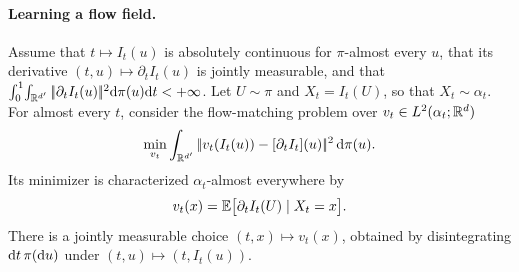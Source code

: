 \paragraph{Learning a flow field.}
\begin{prop}\label{prop-flow-matching-vector-field}
Assume that $t\mapsto I_t(u)$ is absolutely continuous for $\pi$-almost every $u$, that its derivative $(t,u)\mapsto\partial_t I_t(u)$ is jointly measurable, and that \(\int_0^1\!\int_{\mathbb{R}^{d'}}|\!| \partial_t I_t(u) |\!|^2\mathrm{d}\pi(u)\mathrm{d} t<+\infty\).
Let \(U\sim\pi\) and \(X_t=I_t(U)\), so that \(X_t\sim\alpha_t\).
For almost every $t$, consider the flow-matching problem over \(v_t\in L^2(\alpha_t;\mathbb{R}^d)\)
\begin{equation}
\min_{v_t} \int_{\mathbb{R}^{d'}} |\!| v_t(I_t(u)) - [\partial_t I_t](u) |\!|^2 \, \mathrm{d}\pi(u). \label{eq:flow-matching}
\end{equation}
Its minimizer is characterized $\alpha_t$-almost everywhere by
\begin{equation}\label{eq:flow-match-conditional}
v_t(x)=\mathbb{E}\bigl[\partial_t I_t(U)\mid X_t=x\bigr].
\end{equation}
There is a jointly measurable choice \((t,x)\mapsto v_t(x)\), obtained by disintegrating \(\mathrm{d} t\,\pi(\mathrm{d} u)\) under \((t,u)\mapsto(t,I_t(u))\).
\end{prop}
